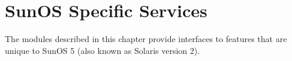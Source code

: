 \chapter{SunOS Specific Services}
\label{sunos}

The modules described in this chapter provide interfaces to features
that are unique to SunOS 5 (also known as Solaris version 2).
